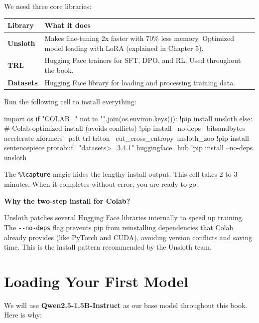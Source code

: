 \begin{chapterenv}
We need three core libraries:

\begin{center}
\begin{tabular}{p{}p{}}
\toprule
\textbf{Library} & \textbf{What it does} \\
\midrule
\textbf{Unsloth} & Makes fine-tuning 2x faster with 70\% less memory. Optimized model loading with LoRA (explained in Chapter 5). \\
\textbf{TRL} & Hugging Face trainers for SFT, DPO, and RL. Used throughout the book. \\
\textbf{Datasets} & Hugging Face library for loading and processing training data. \\
\bottomrule
\end{tabular}
\end{center}

Run the following cell to install everything:

\begin{codeblock}[python]
import os
if "COLAB_" not in "".join(os.environ.keys()):
    !pip install unsloth
else:
    # Colab-optimized install (avoids conflicts)
    !pip install --no-deps \
        bitsandbytes accelerate xformers \
        peft trl triton \
        cut_cross_entropy unsloth_zoo
    !pip install sentencepiece protobuf \
        "datasets>=3.4.1" huggingface_hub
    !pip install --no-deps unsloth
\end{codeblock}

The \texttt{\%\%capture} magic hides the lengthy install output. This cell takes 2 to 3 minutes. When it completes without error, you are ready to go.

\begin{infobox}
\textbf{Why the two-step install for Colab?}

Unsloth patches several Hugging Face libraries internally to speed up training. The \texttt{-{}-no-deps} flag prevents pip from reinstalling dependencies that Colab already provides (like PyTorch and CUDA), avoiding version conflicts and saving time. This is the install pattern recommended by the Unsloth team.
\end{infobox}

\section{Loading Your First Model}

We will use \textbf{Qwen2.5-1.5B-Instruct} as our base model throughout this book. Here is why:


\end{chapterenv}
